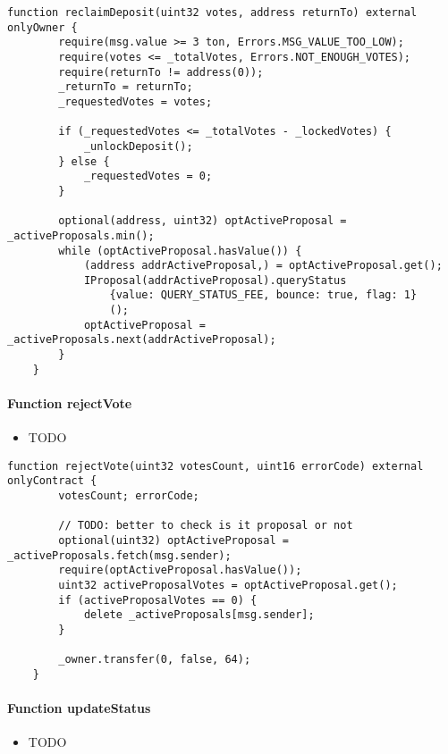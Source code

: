\begin{lstlisting}[firstnumber=103]
    function reclaimDeposit(uint32 votes, address returnTo) external onlyOwner {
        require(msg.value >= 3 ton, Errors.MSG_VALUE_TOO_LOW);
        require(votes <= _totalVotes, Errors.NOT_ENOUGH_VOTES);
        require(returnTo != address(0));
        _returnTo = returnTo;
        _requestedVotes = votes;

        if (_requestedVotes <= _totalVotes - _lockedVotes) {
            _unlockDeposit();
        } else {
            _requestedVotes = 0;
        }

        optional(address, uint32) optActiveProposal = _activeProposals.min();
        while (optActiveProposal.hasValue()) {
            (address addrActiveProposal,) = optActiveProposal.get();
            IProposal(addrActiveProposal).queryStatus
                {value: QUERY_STATUS_FEE, bounce: true, flag: 1}
                ();
            optActiveProposal = _activeProposals.next(addrActiveProposal);
        }
    }
\end{lstlisting}

\paragraph{Function rejectVote}

\begin{itemize}
\item TODO
\end{itemize}

\begin{lstlisting}[firstnumber=87]
    function rejectVote(uint32 votesCount, uint16 errorCode) external onlyContract {
        votesCount; errorCode;

        // TODO: better to check is it proposal or not
        optional(uint32) optActiveProposal = _activeProposals.fetch(msg.sender);
        require(optActiveProposal.hasValue());
        uint32 activeProposalVotes = optActiveProposal.get();
        if (activeProposalVotes == 0) {
            delete _activeProposals[msg.sender];
        }

        _owner.transfer(0, false, 64);
    }
\end{lstlisting}

\paragraph{Function updateStatus}

\begin{itemize}
\item TODO
\end{itemize}

